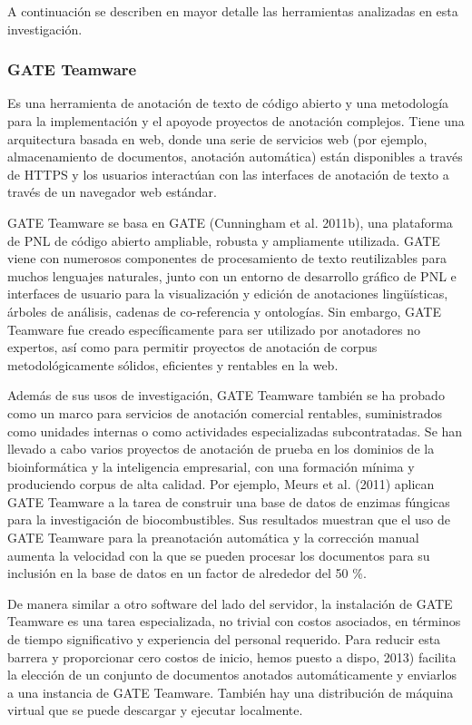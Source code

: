 A continuación se describen en mayor detalle las herramientas analizadas en esta investigación.

\subsubsection*{GATE Teamware}

Es una herramienta de anotación de texto de código abierto y una metodología para la implementación y el apoyode proyectos de anotación complejos. Tiene una arquitectura basada en web, donde una serie de servicios web (por ejemplo, almacenamiento de documentos, anotación automática) están disponibles a través de HTTPS y los usuarios interactúan con las interfaces de anotación de texto a través de un navegador web estándar.

GATE Teamware se basa en GATE (Cunningham et al. 2011b), una plataforma de PNL de código abierto ampliable, robusta y ampliamente utilizada. GATE viene con numerosos componentes de procesamiento de texto reutilizables para muchos lenguajes naturales, junto con un entorno de desarrollo gráfico de PNL e interfaces de usuario para la visualización y edición de anotaciones lingüísticas, árboles de análisis, cadenas de co-referencia y ontologías. Sin embargo, GATE Teamware fue creado específicamente para ser utilizado por anotadores no expertos, así como para permitir proyectos de anotación de corpus metodológicamente sólidos, eficientes y rentables en la web.

Además de sus usos de investigación, GATE Teamware también se ha probado como un marco para servicios de anotación comercial rentables, suministrados como unidades internas o como actividades especializadas subcontratadas. Se han llevado a cabo varios proyectos de anotación de prueba en los dominios de la bioinformática y la inteligencia empresarial, con una formación mínima y produciendo corpus de alta calidad. Por ejemplo, Meurs et al. (2011) aplican GATE Teamware a la tarea de construir una base de datos de enzimas fúngicas para la investigación de biocombustibles. Sus resultados muestran que el uso de GATE Teamware para la preanotación automática y la corrección manual aumenta la velocidad con la que se pueden procesar los documentos para su inclusión en la base de datos en un factor de alrededor del 50 \%.

De manera similar a otro software del lado del servidor, la instalación de GATE Teamware es una tarea especializada, no trivial con costos asociados, en términos de tiempo significativo y experiencia del personal requerido. Para reducir esta barrera y proporcionar cero costos de inicio, hemos puesto a dispo, 2013) facilita la elección de un conjunto de documentos anotados automáticamente y enviarlos a una instancia de GATE Teamware. También hay una distribución de máquina virtual que se puede descargar y ejecutar localmente.

